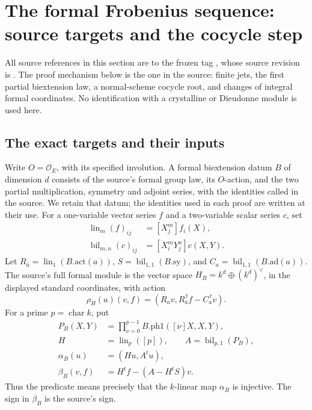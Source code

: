 \section{The formal Frobenius sequence: source targets and the cocycle step}
\label{sec:faithful-frobenius-cocycle}

All source references in this section are to the frozen tag
, whose source revision is
.
The proof mechanism below is the one in the source: finite jets,
the first partial biextension law, a normal-scheme cocycle root,
and changes of integral formal coordinates.  No identification
with a crystalline or Dieudonne module is used here.

\subsection{The exact targets and their inputs}
\label{subsec:faithful-frobenius-targets}

Write \(O=\mathcal O_E\), with its specified involution.
A formal biextension datum \(B\) of dimension \(d\) consists
of the source's formal group law, its \(O\)-action, and the
two partial multiplication, symmetry and adjoint series,
with the identities called  in the source.
We retain that datum; the identities used in each proof
are written at their use.
For a one-variable vector series \(f\) and a two-variable
scalar series \(c\), set
\[
 \begin{split}
 \operatorname{lin}_m(f)_{ij}&=[X_j^m]f_i(X),\\
 \operatorname{bil}_{m,n}(c)_{ij}&=[X_i^mY_j^n]c(X,Y).
 \end{split}
\]
Let \(R_a=\operatorname{lin}_1(B.\mathrm{act}(a))\),
\(S=\operatorname{bil}_{1,1}(B.\mathrm{sy})\), and
\(C_a=\operatorname{bil}_{1,1}(B.\mathrm{ad}(a))\).
The source's full formal module is the vector space
\(H_B=k^d\oplus(k^d)^\vee\), in the displayed standard
coordinates, with action
\[
       \rho_H(a)(v,f)=(R_av,R_{\bar a}^{\,t}f-C_a^{\,t}v).
 \tag{FC1}\label{eq:faithful-formal-H-action}
\]
For a prime \(p=\operatorname{char}k\), put
\[
 \begin{split}
 P_B(X,Y)&=\prod_{\nu=0}^{p-1}
       B.\mathrm{ph1}([\nu]X,X,Y),\\
 H&=\operatorname{lin}_p([p]),\qquad
 A=\operatorname{bil}_{p,1}(P_B),\\
 \alpha_B(u)&=(Hu,A^tu),\\
 \beta_B(v,f)&=H^tf-(A-H^tS)v .
 \end{split}
 \tag{FC2}\label{eq:faithful-alpha-beta}
\]
Thus the predicate  means precisely
that the \(k\)-linear map \(\alpha_B\) is injective.
The sign in \(\beta_B\) is the source's sign.

